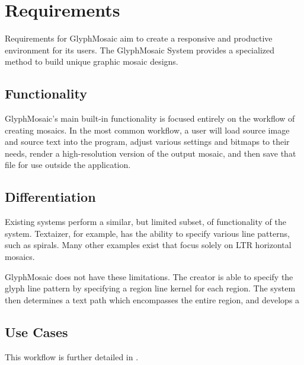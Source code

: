 \section{Requirements}
Requirements for GlyphMosaic aim to create a responsive and productive environment for its users.
The GlyphMosaic System provides a specialized method to build unique graphic mosaic designs.


\subsection{Functionality}
GlyphMosaic’s main built-in functionality is focused entirely on the workflow of creating mosaics.
In the most common workflow, a user will load source image and source text into the program, adjust various settings and bitmaps to their needs, render a high-resolution version of the output mosaic, and then save that file for use outside the application.


\subsection{Differentiation}
Existing systems perform a similar, but limited subset, of functionality of the system.
Textaizer\cite{textaizer}, for example, has the ability to specify various line patterns, such as spirals.
Many other examples exist that focus solely on LTR horizontal mosaics.

GlyphMosaic does not have these limitations.
The creator is able to specify the glyph line pattern by specifying a region line kernel for each region.
The system then determines a text path which encompasses the entire region, and develops a

\subsection{Use Cases}
\label{sec:use_cases}

\begin{itemize}
\end{itemize}

This workflow is further detailed in .